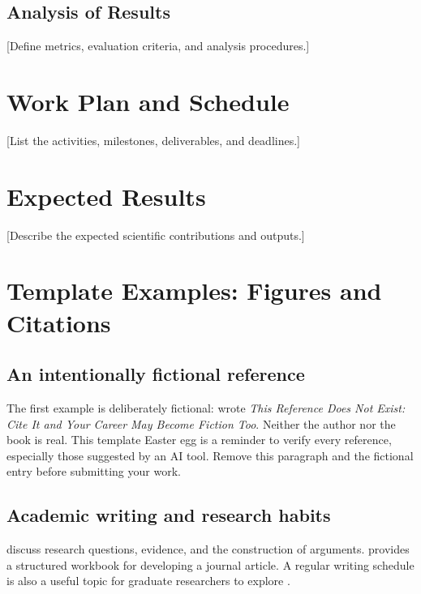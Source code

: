 \documentclass[a4paper,12pt]{article}
\begin{document}
\subsection{Analysis of Results}
[Define metrics, evaluation criteria, and analysis
procedures.]

\section{Work Plan and Schedule}
[List the activities, milestones, deliverables, and
deadlines.]

\section{Expected Results}
[Describe the expected scientific contributions and
outputs.]

\section{Template Examples: Figures and Citations}

\subsection{An intentionally fictional reference}
The first example is deliberately fictional:
 wrote
\emph{This Reference Does Not Exist: Cite It and Your
Career May Become Fiction Too}. Neither the author
nor the book is real. This template Easter egg is a
reminder to verify every reference, especially those
suggested by an AI tool. Remove this paragraph and
the fictional entry before submitting your work.

\subsection{Academic writing and research habits}
 discuss research questions,
evidence, and the construction of arguments.
 provides a structured
workbook for developing a journal article.
A regular writing schedule is also a useful topic
for graduate researchers to explore
\cite{silvia2018write}.
\end{document}
